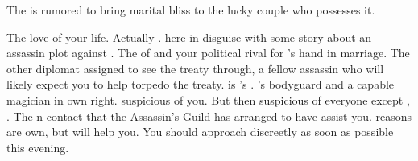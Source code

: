 \documentclass[char]{NeptuneBall}
\begin{document}
\begin{itemz}[Trivia]
  \item The \iGlowShell{\MYname} is rumored to bring marital bliss to the lucky couple who possesses it.
\end{itemz}

\begin{contacts}
  \contact{\cPrincess{}} The love of your life.
  \contact{\cQueen{}} Actually \cQueen{}. \cQueen{\They} \cQueen{\are} here in disguise with some story about an assassin plot against \cKing{\King} \cKing{}.
  \contact{\cPrince{}} The \cPrince{\prince} of \pPacifica{} and your political rival for \cPrincess{}'s hand in marriage.
  \contact{\cSpy{}} The other diplomat assigned to see the treaty through, a fellow assassin who will likely expect you to help torpedo the treaty. \cSpy{} is \cBodyguard{}'s \cSpy{\sibling}.
  \contact{\cBodyguard{}} \cPrince{}'s bodyguard and a capable magician in \cBodyguard{\their} own right. \cBodyguard{\They}  suspicious of you. But then \cBodyguard{\they} \cBodyguard{\are} suspicious of everyone except \cBodyguard{\their} \cSpy{\sibling}, \cSpy{}.
  \contact{\cManta{}} The \pAtlantis{}n contact that the Assassin's Guild has arranged to have assist you. \cManta{\Their} reasons are \cManta{\their} own, but \cManta{\they} will help you. You should approach \cManta{\them} discreetly as soon as possible this evening.
\end{contacts}
\end{document}
